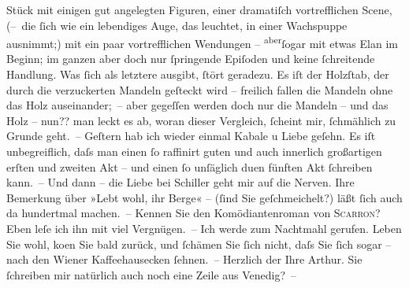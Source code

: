 \begin{ledgroupsized}[t]{13cm}
               Stück mit einigen gut angelegten Figuren, einer dramatiſch {\pb}vortrefflichen Scene, (– die \introOben{}ſich\introOben{} wie ein lebendiges Auge, das leuchtet,  in einer Wachspuppe ausnimmt;) mit ein paar vortrefflichen
               Wendungen – \substVorne{}\textsuperscript{aber}\substDazwischen{}ſogar\substHinten{} mit etwas Elan im Beginn; im ganzen aber doch nur ſpringende Epiſoden und
               keine ſchreitende Handlung. Was ſich als letztere ausgibt, ſtört geradezu. Es iſt der
               Holzſtab, der durch die verzuckerten Mandeln geſteckt wird – freilich fallen die
               Mandeln ohne das Holz auseinander; – aber gegeſſen werden doch nur die Mandeln – und
               das Holz – nun?? man leckt es ab, woran dieser Vergleich, ſcheint mir, {\pb}ſchmählich zu Grunde geht. –\pend
           \pstart
           Geſtern hab ich wieder einmal Kabale u Liebe
               geſehn. Es iſt unbegreiflich, daſs man einen ſo raffinirt guten und auch innerlich
               großartigen erſten und zweiten Akt – und einen ſo unſäglich du{\geminationm}en fünften Akt ſchreiben kann. – Und dann – die Liebe
               bei Schiller geht mir auf die Nerven. Ihre
               Bemerkung über »Lebt wohl, ihr Berge« – (ſind Sie geſchmeichelt?) läßt ſich auch da
               hundertmal machen. –\pend
           \pstart
           Kennen Sie den Komödiantenroman von \textsc{Scarron}? Eben leſe ich ihn mit viel Vergnügen. – Ich werde zum Nachtmahl {\pb}gerufen. Leben Sie wohl, ko{\geminationm}en Sie bald zurück, und ſchämen Sie ſich nicht, daſs
               Sie ſich sogar – nach den Wiener Kaffeehausecken
               ſehnen. –\pend
           \pstart Herzlich der Ihre \spacefill\mbox{Arthur.}\pend{}\pstart
           \noindent{}Sie ſchreiben mir natürlich auch noch eine Zeile aus Venedig? –\pend
           
         
         \endnumbering{}\end{ledgroupsized}  \newcommand{\dateiname}{L00392}\newcommand{\titel}{Arthur Schnitzler an Richard Beer-Hofmann, 26. 10. 1894}\newcommand{\editorInnen}{Martin Anton Müller und Gerd-Hermann Susen}
      